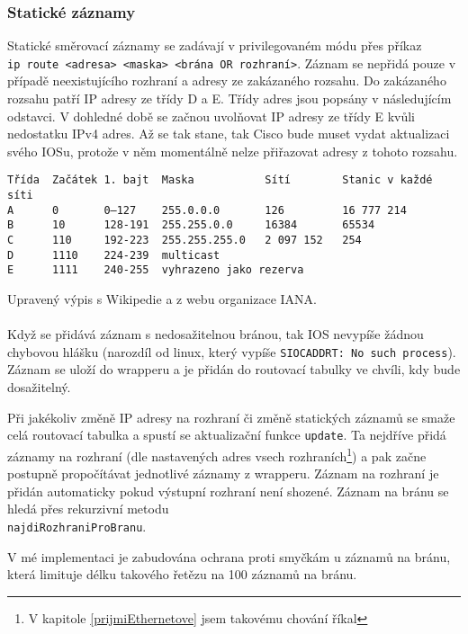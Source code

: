 \subsubsection{Statické záznamy}
Statické směrovací záznamy se zadávají v privilegovaném módu přes příkaz \\\verb|ip route <adresa> <maska> <brána OR rozhraní>|. Záznam se nepřidá pouze v případě neexistujícího rozhraní a adresy ze zakázaného rozsahu. Do zakázaného rozsahu patří IP adresy ze třídy D a E. Třídy adres jsou popsány v následujícím odstavci. V dohledné době se začnou uvolňovat IP adresy ze třídy E kvůli nedostatku IPv4 adres. Až se tak stane, tak Cisco bude muset vydat aktualizaci svého IOSu, protože v něm momentálně nelze přiřazovat adresy z tohoto rozsahu.
\begin{verbatim}
Třída  Začátek 1. bajt  Maska           Sítí        Stanic v každé síti
A      0       0–127    255.0.0.0       126         16 777 214
B      10      128-191  255.255.0.0     16384       65534
C      110     192-223  255.255.255.0   2 097 152   254
D      1110    224-239  multicast
E      1111    240-255  vyhrazeno jako rezerva
\end{verbatim}
Upravený výpis s Wikipedie \cite{wiki:ip} a z webu organizace IANA\cite{iana}.

\paragraph{}
Když se přidává záznam s nedosažitelnou bránou, tak IOS nevypíše žádnou chybovou hlášku (narozdíl od linux, který vypíše \verb|SIOCADDRT: No such process|). Záznam se uloží do wrapperu a je přidán do routovací tabulky ve chvíli, kdy bude dosažitelný. 

Při jakékoliv změně IP adresy na rozhraní či změně statických záznamů se smaže celá routovací tabulka a spustí se aktualizační funkce \verb|update|. Ta nejdříve přidá záznamy na rozhraní (dle nastavených adres vsech rozhraních\footnote{V kapitole \ref{prijmiEthernetove} jsem takovému chování říkal }) a pak začne postupně propočítávat jednotlivé záznamy z wrapperu. Záznam na rozhraní je přidán automaticky pokud výstupní rozhraní není shozené. Záznam na bránu se hledá přes rekurzivní metodu \\\verb|najdiRozhraniProBranu|.

V mé implementaci je zabudována ochrana proti smyčkám u záznamů na bránu, která limituje délku takového řetězu na 100 záznamů na bránu.

